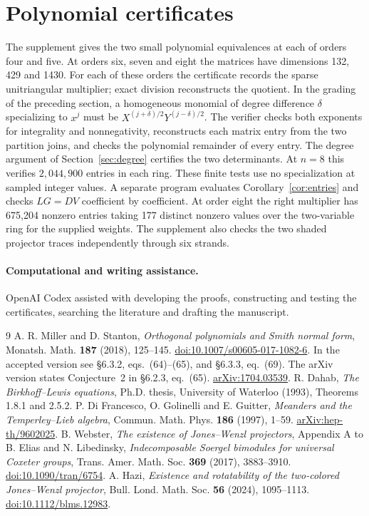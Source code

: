 \documentclass[11pt]{article}
\begin{document}


\section{Polynomial certificates}
The supplement gives the two small polynomial equivalences at each of
orders four and five. At orders six, seven and eight the matrices have
dimensions 132, 429 and 1430. For each of these orders the certificate records
the sparse unitriangular multiplier; exact division reconstructs
the quotient. In the grading of the preceding section, a homogeneous
monomial of degree difference \(\delta\) specializing to \(x^j\)
must be \(X^{(j+\delta)/2}Y^{(j-\delta)/2}\).
The verifier checks both exponents for integrality and nonnegativity,
reconstructs each matrix entry from the two partition joins, and
checks the polynomial remainder of every entry. The degree argument
of Section~\ref{sec:degree} certifies the two determinants. At \(n=8\)
this verifies \(2{,}044{,}900\) entries in each ring. These finite
tests use no specialization at sampled integer values. A separate program evaluates
Corollary~\ref{cor:entries} and checks \(LG=DV\) coefficient by coefficient.
At order eight the right multiplier has 675,204 nonzero entries taking 177 distinct
nonzero values over the two-variable ring for the supplied weights. The supplement also
checks the two shaded projector traces independently through six strands.
\paragraph{Computational and writing assistance.}
OpenAI Codex assisted with developing the proofs, constructing and testing
the certificates, searching the literature and drafting the manuscript.
\begin{thebibliography}{9}
 A. R. Miller and D. Stanton,
\emph{Orthogonal polynomials and Smith normal form},
Monatsh. Math. \textbf{187} (2018), 125--145.
\href{https://doi.org/10.1007/s00605-017-1082-6}{doi:10.1007/s00605-017-1082-6}.
In the accepted version see \S6.3.2, eqs.~(64)--(65), and
\S6.3.3, eq.~(69). The arXiv version states Conjecture~2 in \S6.2.3, eq.~(65).
\href{https://arxiv.org/abs/1704.03539}{arXiv:1704.03539}.
 R. Dahab,
\emph{The Birkhoff--Lewis equations}, Ph.D. thesis,
University of Waterloo (1993), Theorems 1.8.1 and 2.5.2.
 P. Di Francesco, O. Golinelli and E. Guitter,
\emph{Meanders and the Temperley--Lieb algebra},
Commun. Math. Phys. \textbf{186} (1997), 1--59.
\href{https://arxiv.org/abs/hep-th/9602025}{arXiv:hep-th/9602025}.
 B. Webster, \emph{The existence of Jones--Wenzl projectors},
Appendix A to B. Elias and N. Libedinsky,
\emph{Indecomposable Soergel bimodules for universal Coxeter groups},
Trans. Amer. Math. Soc. \textbf{369} (2017), 3883--3910.
\href{https://doi.org/10.1090/tran/6754}{doi:10.1090/tran/6754}.
 A. Hazi,
\emph{Existence and rotatability of the two-colored Jones--Wenzl projector},
Bull. Lond. Math. Soc. \textbf{56} (2024), 1095--1113.
\href{https://doi.org/10.1112/blms.12983}{doi:10.1112/blms.12983}.
\end{thebibliography}
\end{document}
